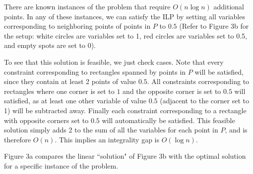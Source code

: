 \documentclass[11pt]{article}
\begin{document}
There are known instances of the problem that require $O(n\log n)$ additional points. In any of these instances, we can satisfy the ILP by setting all variables corresponding to neighboring points of points in $P$ to $0.5$ (Refer to Figure 3b for the setup: white circles are variables set to 1, red circles are variables set to 0.5, and empty spots are set to 0).

To see that this solution is feasible, we just check cases. Note that every constraint corresponding to rectangles spanned by points in $P$ will be satisfied, since they contain at least 2 points of value $0.5$. All constraints corresponding to rectangles where one corner is set to $1$ and the opposite corner is set to $0.5$ will satisfied, as at least one other variable of value $0.5$ (adjacent to the corner set to 1) will be subtracted away. Finally each constraint corresponding to a rectangle with opposite corners set to $0.5$ will automatically be satisfied. This feasible solution simply adds 2 to the sum of all the variables for each point in $P$, and is therefore $O(n)$. This implies an integrality gap is $O(\log n)$. 

Figure 3a compares the linear ``solution" of Figure 3b with the optimal solution for a specific instance of the problem. 

\end{document}
